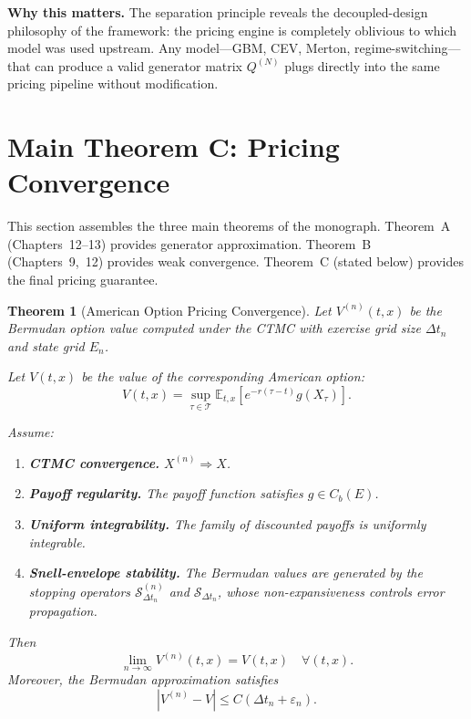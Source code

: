 \documentclass[11pt,a4paper,openany]{book}
\theoremstyle{definition}
\theoremstyle{plain}
\newtheorem{theorem}{Theorem}[chapter]
\theoremstyle{remark}
\newcommand{\1}{\mathbbm{1}}
\begin{document}
\medskip
\noindent\textbf{Why this matters.} The separation principle reveals the decoupled-design philosophy of the framework: the pricing engine is completely oblivious to which model was used upstream. Any model---GBM, CEV, Merton, regime-switching---that can produce a valid generator matrix $Q^{(N)}$ plugs directly into the same pricing pipeline without modification.

\section{Main Theorem C: Pricing Convergence}

This section assembles the three main theorems of the monograph. Theorem~A (Chapters~12--13) provides generator approximation. Theorem~B (Chapters~9,~12) provides weak convergence. Theorem~C (stated below) provides the final pricing guarantee.

\begin{theorem}[American Option Pricing Convergence]
\label{thm:main}
Let $V^{(n)}(t,x)$ be the Bermudan option value computed under the CTMC with exercise grid size $\Delta t_n$ and state grid $E_n$.

Let $V(t,x)$ be the value of the corresponding American option:
\[
V(t,x) = \sup_{\tau \in \mathcal{T}} \mathbb{E}_{t,x}
\left[e^{-r(\tau-t)} g(X_\tau)\right].
\]

Assume:
\begin{enumerate}[label=(B\arabic*)]
    \item \textbf{CTMC convergence.} $X^{(n)} \Rightarrow X$.
    \item \textbf{Payoff regularity.} The payoff function satisfies $g \in C_b(E)$.
    \item \textbf{Uniform integrability.} The family of discounted payoffs is uniformly integrable.
    \item \textbf{Snell-envelope stability.} The Bermudan values are generated by the stopping operators $\mathcal{S}_{\Delta t_n}^{(n)}$ and $\mathcal{S}_{\Delta t_n}$, whose non-expansiveness controls error propagation.
\end{enumerate}
Then
\[
\lim_{n \to \infty} V^{(n)}(t,x) = V(t,x) \quad \forall (t,x).
\]
Moreover, the Bermudan approximation satisfies
\[
|V^{(n)} - V| \le C (\Delta t_n + \varepsilon_n).
\]
\end{theorem}
\end{document}
